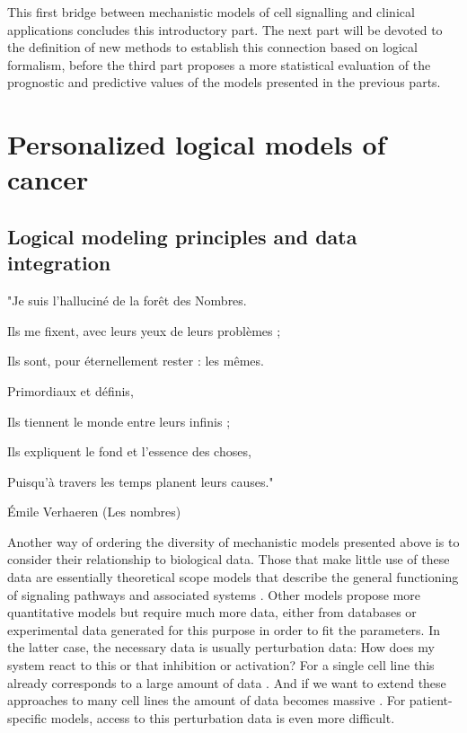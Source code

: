 \documentclass[a4paper,12pt,twoside,onecolumn,openright,final,oldfontcommands]{memoir}
\newcommand{\initial}[1]{
	\lettrine[lines=3,lhang=0.33,nindent=0em]{
		\color{gray}
     		{\textsc{#1}}}{}}
\begin{document}
This first bridge between mechanistic models of cell signalling and
clinical applications concludes this introductory part. The next part
will be devoted to the definition of new methods to establish this
connection based on logical formalism, before the third part proposes a
more statistical evaluation of the prognostic and predictive values of
the models presented in the previous parts.

\part{Personalized logical models of
cancer}\label{part-personalized-logical-models-of-cancer}

\chapter{Logical modeling principles and data
integration}\label{logical-modeling-principles-and-data-integration}

\epigraph{"Je suis l’halluciné de la forêt des Nombres.

Ils me fixent, avec leurs yeux de leurs problèmes ;

Ils sont, pour éternellement rester : les mêmes.

Primordiaux et définis,

Ils tiennent le monde entre leurs infinis ;

Ils expliquent le fond et l’essence des choses,

Puisqu’à travers les temps planent leurs causes."}{Émile Verhaeren (Les nombres)}

\initial{A}nother way of ordering the diversity of mechanistic models
presented above is to consider their relationship to biological data.
Those that make little use of these data are essentially theoretical
scope models that describe the general functioning of signaling pathways
and associated systems \citep{calzone2010mathematical}. Other models
propose more quantitative models but require much more data, either from
databases or experimental data generated for this purpose in order to
fit the parameters. In the latter case, the necessary data is usually
perturbation data: How does my system react to this or that inhibition
or activation? For a single cell line this already corresponds to a
large amount of data \citep{razzaq2018computational}. And if we want to
extend these approaches to many cell lines the amount of data becomes
massive \citep{frohlich2018efficient}. For patient-specific models,
access to this perturbation data is even more difficult.
\end{document}
